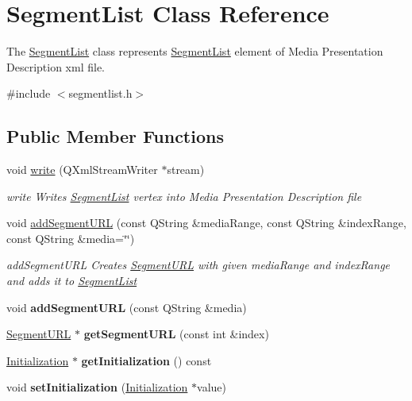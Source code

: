 \hypertarget{class_segment_list}{\section{Segment\-List Class Reference}
\label{class_segment_list}
}


The \hyperlink{class_segment_list}{Segment\-List} class represents \hyperlink{class_segment_list}{Segment\-List} element of Media Presentation Description xml file.  




{\ttfamily \#include $<$segmentlist.\-h$>$}

\subsection*{Public Member Functions}
\begin{DoxyCompactItemize}
\item 
void \hyperlink{class_segment_list_a81ea7f0f3e64e12b5822ce42ce1df599}{write} (Q\-Xml\-Stream\-Writer $\ast$stream)
\begin{DoxyCompactList}\small\item\em write Writes \hyperlink{class_segment_list}{Segment\-List} vertex into Media Presentation Description file \end{DoxyCompactList}\item 
void \hyperlink{class_segment_list_a67bf32fd52a7ad03042d2273727fffea}{add\-Segment\-U\-R\-L} (const Q\-String \&media\-Range, const Q\-String \&index\-Range, const Q\-String \&media=\char`\"{}\char`\"{})
\begin{DoxyCompactList}\small\item\em add\-Segment\-U\-R\-L Creates \hyperlink{class_segment_u_r_l}{Segment\-U\-R\-L} with given media\-Range and index\-Range and adds it to \hyperlink{class_segment_list}{Segment\-List} \end{DoxyCompactList}\item 
\hypertarget{class_segment_list_a496d545a0f79656894c24214314c770d}{void {\bfseries add\-Segment\-U\-R\-L} (const Q\-String \&media)}\label{class_segment_list_a496d545a0f79656894c24214314c770d}

\item 
\hypertarget{class_segment_list_ad04de1dd66218c87cea21a024fc77386}{\hyperlink{class_segment_u_r_l}{Segment\-U\-R\-L} $\ast$ {\bfseries get\-Segment\-U\-R\-L} (const int \&index)}\label{class_segment_list_ad04de1dd66218c87cea21a024fc77386}

\item 
\hypertarget{class_segment_list_af264f50e65d1e94e175d62cf304583d4}{\hyperlink{class_initialization}{Initialization} $\ast$ {\bfseries get\-Initialization} () const }\label{class_segment_list_af264f50e65d1e94e175d62cf304583d4}

\item 
\hypertarget{class_segment_list_a788081b6b66468f8a727565bab53e630}{void {\bfseries set\-Initialization} (\hyperlink{class_initialization}{Initialization} $\ast$value)}\label{class_segment_list_a788081b6b66468f8a727565bab53e630}

\end{DoxyCompactItemize}


